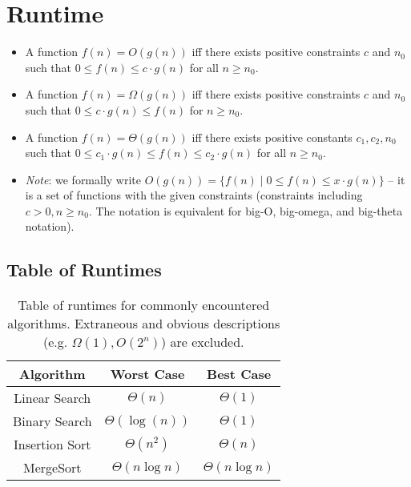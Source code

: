 \documentclass[11pt]{article}
\begin{document}
\section{Runtime}
\begin{tcolorbox}
\begin{itemize}
    \item A function $f(n) = O(g(n))$ iff there exists positive constraints $c$ and $n_0$ such that $0 \leq f(n) \leq c \cdot g(n)$ for all $n \geq n_0$.

    \item A function $f(n) = \Omega(g(n))$ iff there exists positive constraints $c$ and $n_0$ such that $0 \leq c \cdot g(n) \leq f(n)$ for $n \geq n_0$.
    
    \item A function $f(n) = \Theta(g(n))$ iff there exists positive constants $c_1, c_2, n_0$ such that $0 \leq c_1 \cdot g(n) \leq f(n) \leq c_2 \cdot g(n)$ for all $n \geq n_0$.

    \item \textit{Note}: we formally write $O(g(n)) = \{ f(n) \; | \; 0 \leq f(n) \leq x \cdot g(n) \}$ -- it is a set of functions with the given constraints (constraints including $c > 0, n \geq n_0$. The notation is equivalent for big-O, big-omega, and big-theta notation).
\end{itemize}
\end{tcolorbox}

\subsection{Table of Runtimes}
\begin{table}[H]
    \centering
    \begin{tabular}{c|c|c}
    \toprule
        Algorithm & Worst Case & Best Case \\
        \midrule
        Linear Search & $\Theta(n)$ & $\Theta(1)$ \\ 
        Binary Search & $\Theta(\log(n))$ & $\Theta(1)$ \\
        Insertion Sort & $\Theta(n^2)$ & $\Theta(n)$ \\
        MergeSort & $\Theta(n \log n)$ & $\Theta(n \log n)$ \\
    \bottomrule
    \end{tabular}
    \caption{Table of runtimes for commonly encountered algorithms. Extraneous and obvious descriptions (e.g. $\Omega(1), O(2^n)$) are excluded.}
    \label{tab:week2_runtimes}
\end{table}
 
\end{document}
